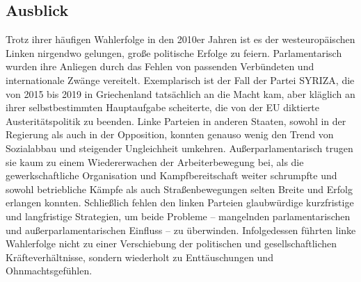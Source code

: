 \begin{multicols*}{2}
\section{Ausblick}

\noindent Trotz ihrer häufigen Wahlerfolge in den 2010er Jahren ist es der westeuropäischen Linken nirgendwo gelungen, große politische Erfolge zu feiern. Parlamentarisch wurden ihre Anliegen durch das Fehlen von passenden Verbündeten und internationale Zwänge vereitelt. Exemplarisch ist der Fall der Partei SYRIZA, die von 2015 bis 2019 in Griechenland tatsächlich an die Macht kam, aber kläglich an ihrer selbstbestimmten Hauptaufgabe scheiterte, die von der EU diktierte Austeritätspolitik zu beenden. Linke Parteien in anderen Staaten, sowohl in der Regierung als auch in der Opposition, konnten genauso wenig den Trend von Sozialabbau und steigender Ungleichheit umkehren. Außerparlamentarisch trugen sie kaum zu einem Wiedererwachen der Arbeiterbewegung bei, als die gewerkschaftliche Organisation und Kampfbereitschaft weiter schrumpfte und sowohl betriebliche Kämpfe als auch Straßenbewegungen selten Breite und Erfolg erlangen konnten. Schließlich fehlen den linken Parteien glaubwürdige kurzfristige und langfristige Strategien, um beide Probleme – mangelnden parlamentarischen und außerparlamentarischen Einfluss – zu überwinden. Infolgedessen führten linke Wahlerfolge nicht zu einer Verschiebung der politischen und gesellschaftlichen Kräfteverhältnisse, sondern wiederholt zu Enttäuschungen und Ohnmachtsgefühlen.\par
    

\end{multicols*}
